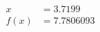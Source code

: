 \documentclass[preview]{standalone}
\begin{document}
\begin{align*}
x &= 3.7199\\f(x) &= 7.7806093
\end{align*}
\end{document}
